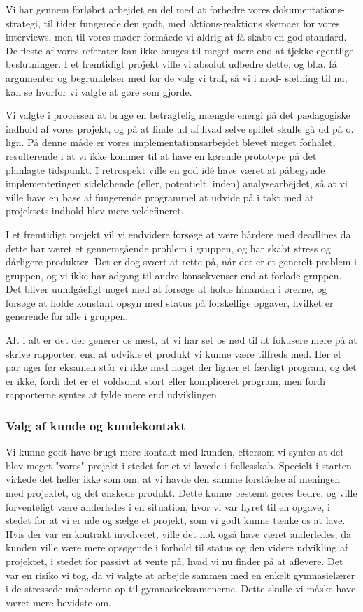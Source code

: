 \documentclass[10pt,a4paper,danish]{article}
\begin{document}
Vi har gennem forløbet arbejdet en del med at forbedre vores dokumentations-
strategi, til tider fungerede den godt, med aktions-reaktions skemaer for vores
interviews, men til vores møder formåede vi aldrig at få skabt en god standard.
De fleste af vores referater kan ikke bruges til meget mere end at tjekke
egentlige beslutninger. I et fremtidigt projekt ville vi absolut udbedre dette,
og bl.a. få argumenter og begrundelser med for de valg vi traf, så vi i mod-
sætning til nu, kan se hvorfor vi valgte at gøre som gjorde.

Vi valgte i processen at bruge en betragtelig mængde energi på det pædagogiske indhold
af vores projekt, og på at finde ud af hvad selve spillet skulle gå ud på o. lign. På 
denne måde er vores implementationsarbejdet blevet meget forhalet, resulterende i at
vi ikke kommer til at have en kørende prototype på det planlagte tidspunkt. I retrospekt
ville en god idé have været at påbegynde implementeringen sideløbende (eller, potentielt, 
inden) analysearbejdet, så at vi ville have en base af fungerende programmel at udvide
på i takt med at projektets indhold blev mere veldefineret.

I et fremtidigt projekt vil vi endvidere forsøge at være hårdere med deadlines da dette har
været et gennemgående problem i gruppen, og har skabt stress og dårligere
produkter. Det er dog svært at rette på, når det er et generelt problem i
gruppen, og vi ikke har adgang til andre konsekvenser end at forlade gruppen.
Det bliver uundgåeligt noget med at forsøge at holde hinanden i ørerne, og
forsøge at holde konstant opsyn med status på forskellige opgaver, hvilket er
generende for alle i gruppen. 

Alt i alt er det der generer os mest, at vi har set os nød til at fokusere mere
på at skrive rapporter, end at udvikle et produkt vi kunne være tilfreds med.
Her et par uger før eksamen står vi ikke med noget der ligner et færdigt program,
og det er ikke, fordi det er et voldsomt stort eller kompliceret program, men
fordi rapporterne syntes at fylde mere end udviklingen. 

\subsubsection{Valg af kunde og kundekontakt}
Vi kunne godt have brugt mere kontakt med kunden, eftersom vi syntes at det blev meget "vores" projekt
i stedet for et vi lavede i fællesskab. Specielt i starten virkede det heller ikke som om, at vi 
havde den samme forståelse af meningen med projektet, og det ønskede produkt.
Dette kunne bestemt gøres bedre, og ville forventeligt være anderledes i en
situation, hvor vi var hyret til en opgave, i stedet for at vi er ude og sælge
et projekt, som vi godt kunne tænke os at lave. Hvis der var en kontrakt involveret, ville det nok også have været anderledes, da kunden ville være mere 
opsøgende i forhold til status og den videre udvikling af projektet, i stedet
for passivt at vente på, hvad vi nu finder på at aflevere. Det var en risiko vi
tog, da vi valgte at arbejde sammen med en enkelt gymnasielærer i de stressede
månederne op til gymnasieeksamenerne. Dette skulle vi måske have været mere
bevidste om. 
\end{document}
